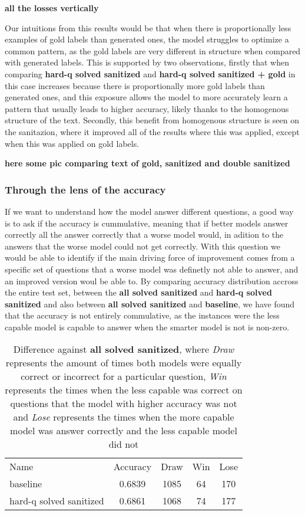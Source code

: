 \documentclass[a4paper,10pt]{article}
\begin{document}
\textbf{all the losses vertically}


Our intuitions from this results would be that when there is proportionally less examples of gold labels than generated ones, the model struggles to optimize a common pattern, as the gold labels are very different in structure when compared with generated labels. This is supported by two observations, firstly that when comparing \textbf{hard-q solved sanitized} and \textbf{hard-q solved sanitized + gold} in this case increases because there is proportionally more gold labels than generated ones, and this exposure allows the model to more accurately learn a pattern that usually leads to higher accuracy, likely thanks to the homogenous structure of the text. Secondly, this benefit from homogenous structure is seen on the sanitazion, where it improved all of the results where this was applied, except when this was applied on gold labels.

\textbf{here some pic comparing text of gold, sanitized and double sanitized}


\subsubsection{Through the lens of the accuracy}
If we want to understand how the model answer different questions, a good way is to ask if the accuracy is cummulative, meaning that if better models answer correctly all the answer correctly that a worse model would, in adition to the answers that the worse model could not get correctly. With this question we would be able to identify if the main driving force of improvement comes from a specific set of questions that a worse model was definetly not able to answer, and an improved version woul be able to. By comparing accuracy distribution accross the entire test set, between the \textbf{all solved sanitized} and \textbf{hard-q solved sanitized} and also between \textbf{all solved sanitized} and \textbf{baseline}, we have found that the accuracy is not entirely commulative, as the instances were the less capable model is capable to answer when the smarter model is not is non-zero. 
\begin{table}[ht]
\centering
 \begin{tabular}{lcccc}
 Name & Accuracy & Draw & Win & Lose\\
 baseline & 0.6839 & 1085 & 64 & 170 \\
 hard-q solved sanitized & 0.6861 & 1068 & 74 & 177\\
 \end{tabular}
 \caption{Difference against \textbf{all solved sanitized}, where \textit{Draw} represents the amount of times both models were equally correct or incorrect for a particular question, \textit{Win} represents the times when the less capable was correct on questions that the model with higher accuracy was not and \textit{Lose} represents the times when the more capable model was answer correctly and the less capable model did not}
\end{table}
\end{document}
